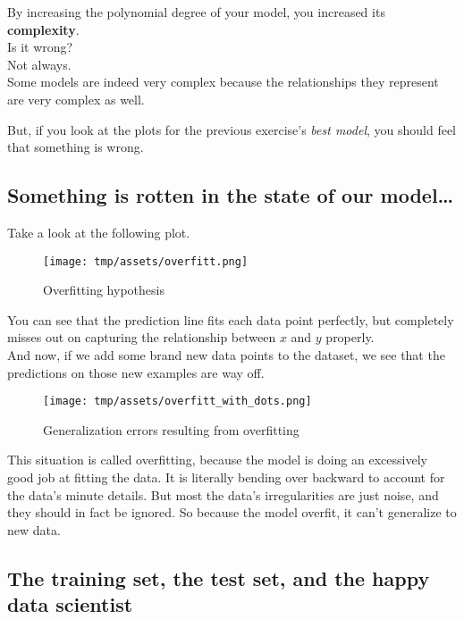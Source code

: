 \documentclass[]{article}
\begin{document}
By increasing the polynomial degree of your model, you increased its
\textbf{complexity}.\\
Is it wrong?\\
Not always.\\
Some models are indeed very complex because the relationships they
represent are very complex as well.

But, if you look at the plots for the previous exercise's \emph{best
model}, you should feel that something is wrong.

\hypertarget{something-is-rotten-in-the-state-of-our-model}{%
\subsection{Something is rotten in the state of our
model\ldots{}}\label{something-is-rotten-in-the-state-of-our-model}}

Take a look at the following plot.

\begin{figure}
\centering
\texttt{[image: tmp/assets/overfitt.png]}
\caption{Overfitting hypothesis}
\end{figure}

You can see that the prediction line fits each data point perfectly, but
completely misses out on capturing the relationship between \(x\) and
\(y\) properly.\\
And now, if we add some brand new data points to the dataset, we see
that the predictions on those new examples are way off.

\begin{figure}
\centering
\texttt{[image: tmp/assets/overfitt\_with\_dots.png]}
\caption{Generalization errors resulting from overfitting}
\end{figure}

This situation is called overfitting, because the model is doing an
excessively good job at fitting the data. It is literally bending over
backward to account for the data's minute details. But most the data's
irregularities are just noise, and they should in fact be ignored. So
because the model overfit, it can't generalize to new data.

\hypertarget{the-training-set-the-test-set-and-the-happy-data-scientist}{%
\subsection{The training set, the test set, and the happy data
scientist}\label{the-training-set-the-test-set-and-the-happy-data-scientist}}
\end{document}
